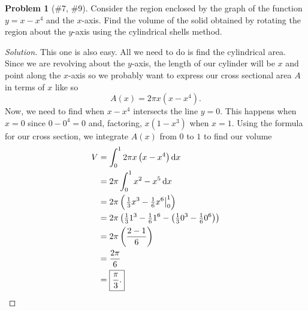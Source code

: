 \documentclass{article}
\theoremstyle{plain}
\theoremstyle{definition}
\newtheorem{problem}[exercise]{Problem}
\theoremstyle{remark}
\DeclareMathOperator{\diff}{d\!}
\begin{document}
\begin{problem}[{\color{Green}\#7}, {\color{Red}\#9}]
Consider the region enclosed by the graph of the function $y=x-x^4$ and the
$x$-axis. Find the volume of the solid obtained by rotating the region
about the $y$-axis using the cylindrical shells method.
\end{problem}
\begin{proof}[Solution]
This one is also easy. All we need to do is find the cylindrical
area. Since we are revolving about the $y$-axis, the length of our
cylinder will be $x$ and point along the $x$-axis so we probably want to
express our cross sectional area $A$ in terms of $x$ like so
\[
A(x)=2\pi x(x-x^4).
\]
Now, we need to find when $x-x^4$ intersects the line $y=0$. This happens
when $x=0$ since $0-0^4=0$ and, factoring, $x(1-x^3)$ when $x=1$. Using the
formula for our cross section, we integrate $A(x)$ from $0$ to $1$ to find
our volume
\begin{align*}
V&=\int_0^12\pi x\left(x-x^4\right)\diff x\\
&=2\pi\int_0^1x^2-x^5\diff x\\
&=2\pi\left(\left.\tfrac{1}{3}x^3-\tfrac{1}{6}x^6\right|_0^1\right)\\
&=2\pi\left(\tfrac{1}{3}1^3-\tfrac{1}{6}1^6-\left(\tfrac{1}{3}0^3-\tfrac{1}{6}0^6\right)\right)\\
&=2\pi\left(\frac{2-1}{6}\right)\\
&=\frac{2\pi}{6}\\
&=\boxed{\frac{\pi}{3}.}\qedhere
\end{align*}
\end{proof}
\end{document}
